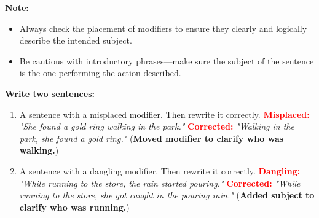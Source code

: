 \documentclass[12pt]{article}
\begin{document}
\vspace{1em}

\begin{tcolorbox}[colframe=black!40, colback=gray!5, 
coltitle=black, colbacktitle=black!20, fonttitle=\bfseries\Large, 
title=Additional Notes, halign title=center, left=5pt, right=5pt, top=5pt, bottom=15pt]
\textbf{Note:}
\begin{itemize}
    \item Always check the placement of modifiers to ensure they clearly and logically describe the intended subject.
    \item Be cautious with introductory phrases—make sure the subject of the sentence is the one performing the action described.
\end{itemize}
\end{tcolorbox}

\vspace{1em}

\begin{tcolorbox}[colframe=black!60, colback=white, 
coltitle=black, colbacktitle=black!15, fonttitle=\bfseries\Large, 
title=Exit Ticket, halign title=center, left=10pt, right=10pt, top=5pt, bottom=15pt]

\textbf{Write two sentences:}
\begin{enumerate}[itemsep=3em]
    \item A sentence with a misplaced modifier. Then rewrite it correctly.  
    \textcolor{red}{\textbf{Misplaced:}} \textit{"She found a gold ring walking in the park."}  
    \textcolor{red}{\textbf{Corrected:}} \textit{"Walking in the park, she found a gold ring."} (\textbf{Moved modifier to clarify who was walking.})

    \item A sentence with a dangling modifier. Then rewrite it correctly.  
    \textcolor{red}{\textbf{Dangling:}} \textit{"While running to the store, the rain started pouring."}  
    \textcolor{red}{\textbf{Corrected:}} \textit{"While running to the store, she got caught in the pouring rain."} (\textbf{Added subject to clarify who was running.})
\end{enumerate}

\vspace{8em}

\end{tcolorbox}
\end{document}
